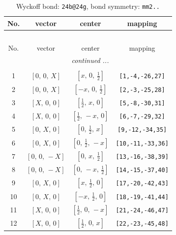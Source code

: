 \documentclass[fleqn,8pt]{jsarticle}
\begin{document}
\renewcommand{\arraystretch}{1.2}
\begin{longtable}{cccc}
\caption{Wyckoff bond: {\tt 24b@24g}, bond symmetry: {\tt mm2..}}
 \\
 \hline \hline
No. & vector & center & mapping \\ \hline \endfirsthead

\multicolumn{3}{l}{\tablename\ \thetable{}} \\
 \hline \hline
No. & vector & center & mapping \\ \hline \endhead

 \hline \hline
\multicolumn{3}{r}{\footnotesize\it continued ...} \\ \endfoot

 \hline \hline
\multicolumn{3}{r}{} \\ \endlastfoot

1 & $\left[ 0,\, 0,\, X \right]$ & $\left[ x,\, 0,\, \frac{1}{2} \right]$ & {\tt [1,-4,-26,27]} \\ \hline
2 & $\left[ 0,\, 0,\, X \right]$ & $\left[ - x,\, 0,\, \frac{1}{2} \right]$ & {\tt [2,-3,-25,28]} \\ \hline
3 & $\left[ X,\, 0,\, 0 \right]$ & $\left[ \frac{1}{2},\, x,\, 0 \right]$ & {\tt [5,-8,-30,31]} \\ \hline
4 & $\left[ X,\, 0,\, 0 \right]$ & $\left[ \frac{1}{2},\, - x,\, 0 \right]$ & {\tt [6,-7,-29,32]} \\ \hline
5 & $\left[ 0,\, X,\, 0 \right]$ & $\left[ 0,\, \frac{1}{2},\, x \right]$ & {\tt [9,-12,-34,35]} \\ \hline
6 & $\left[ 0,\, X,\, 0 \right]$ & $\left[ 0,\, \frac{1}{2},\, - x \right]$ & {\tt [10,-11,-33,36]} \\ \hline
7 & $\left[ 0,\, 0,\, - X \right]$ & $\left[ 0,\, x,\, \frac{1}{2} \right]$ & {\tt [13,-16,-38,39]} \\ \hline
8 & $\left[ 0,\, 0,\, - X \right]$ & $\left[ 0,\, - x,\, \frac{1}{2} \right]$ & {\tt [14,-15,-37,40]} \\ \hline
9 & $\left[ 0,\, X,\, 0 \right]$ & $\left[ x,\, \frac{1}{2},\, 0 \right]$ & {\tt [17,-20,-42,43]} \\ \hline
10 & $\left[ 0,\, X,\, 0 \right]$ & $\left[ - x,\, \frac{1}{2},\, 0 \right]$ & {\tt [18,-19,-41,44]} \\ \hline
11 & $\left[ X,\, 0,\, 0 \right]$ & $\left[ \frac{1}{2},\, 0,\, - x \right]$ & {\tt [21,-24,-46,47]} \\ \hline
12 & $\left[ X,\, 0,\, 0 \right]$ & $\left[ \frac{1}{2},\, 0,\, x \right]$ & {\tt [22,-23,-45,48]} \\
\end{longtable}
\end{document}
